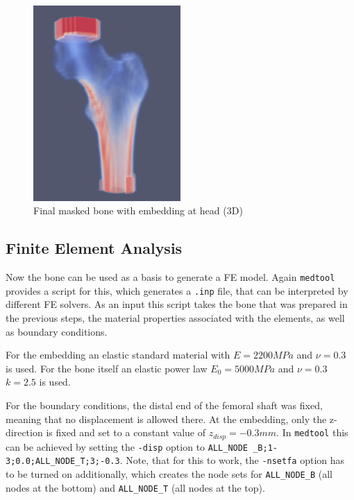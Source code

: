 \documentclass[a4paper,12pt]{article}
\begin{document}
    \begin{figure}[htbp]
        \centering
        \includegraphics[width=0.5\textwidth]{bone_embedded}
        \caption{Final masked bone with embedding at head (3D)}
        \label{fig:bone_embedded}
    \end{figure}

    \subsection{Finite Element Analysis}\label{subsec:model-generation}
    Now the bone can be used as a basis to generate a FE model.
    Again \texttt{medtool} provides a script for this, which generates a \texttt{.inp} file, that can be interpreted by different FE solvers.
    As an input this script takes the bone that was prepared in the previous steps, the material properties associated with the elements, as well as boundary conditions.

    \vspace{10pt}
    For the embedding an elastic standard material with $E = 2200 MPa$ and $\nu = 0.3$ is used.
    For the bone itself an elastic power law $E_0 = 5000 MPa$ and $\nu = 0.3$ $k = 2.5$ is used.

    \vspace{10pt}
    For the boundary conditions, the distal end of the femoral shaft was fixed, meaning that no displacement is allowed there.
    At the embedding, only the z-direction is fixed and set to a constant value of $z_{disp} = -0.3 mm$.
    In \texttt{medtool} this can be achieved by setting the \texttt{-disp} option to \texttt{ALL\_NODE \_B;1-3;0.0;ALL\_NODE\_T;3;-0.3}.
    Note, that for this to work, the \texttt{-nsetfa} option has to be turned on additionally, which creates the node sets for \texttt{ALL\_NODE\_B} (all nodes at the bottom) and \texttt{ALL\_NODE\_T} (all nodes at the top).
\end{document}
